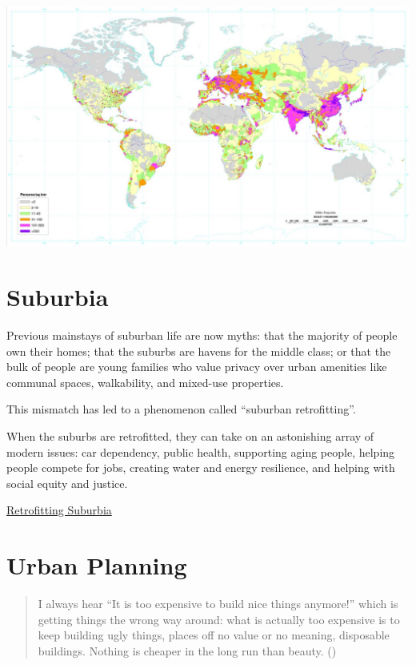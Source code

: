 \documentclass[
]{book}
\begin{document}
\includegraphics{fig/World_Pop_Dens_by_Color.jpeg}

\hypertarget{suburbia}{%
\chapter{Suburbia}\label{suburbia}}

Previous mainstays of suburban life are now myths: that the majority of people own their homes; that the suburbs are havens for the middle class; or that the bulk of people are young families who value privacy over urban amenities like communal spaces, walkability, and mixed-use properties.

This mismatch has led to a phenomenon called ``suburban retrofitting''.

When the suburbs are retrofitted, they can take on an astonishing array of modern issues:
car dependency, public health, supporting aging people, helping people compete for jobs,
creating water and energy resilience, and helping with social equity and justice.

\href{https://www.vice.com/en/article/y3gx5b/the-people-the-suburbs-were-built-for-are-gone}{Retrofitting Suburbia}

\hypertarget{urban-planning}{%
\chapter{Urban Planning}\label{urban-planning}}

\begin{quote}
I always hear ``It is too expensive to build nice things anymore!'' which is getting things the wrong way around: what is actually too expensive is to keep building ugly things, places off no value or no meaning, disposable buildings. Nothing is cheaper in the long run than beauty. (\citet{wrathofgnon})
\end{quote}
\end{document}
